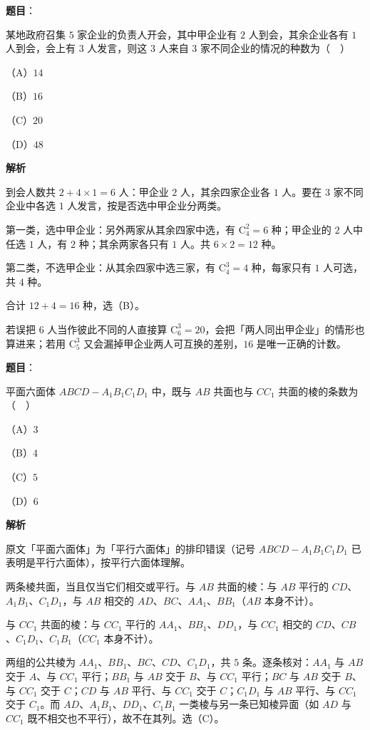 \begin{answer}

\textbf{题目}：

某地政府召集 $5$ 家企业的负责人开会，其中甲企业有 $2$ 人到会，其余企业各有 $1$ 人到会，会上有 $3$ 人发言，则这 $3$ 人来自 $3$ 家不同企业的情况的种数为（　）

（A）$14$

（B）$16$

（C）$20$

（D）$48$

\textbf{解析}

到会人数共 $2+4\times1=6$ 人：甲企业 $2$ 人，其余四家企业各 $1$ 人。要在 $3$ 家不同企业中各选 $1$ 人发言，按是否选中甲企业分两类。

第一类，选中甲企业：另外两家从其余四家中选，有 $\mathrm C_4^2=6$ 种；甲企业的 $2$ 人中任选 $1$ 人，有 $2$ 种；其余两家各只有 $1$ 人。共 $6\times2=12$ 种。

第二类，不选甲企业：从其余四家中选三家，有 $\mathrm C_4^3=4$ 种，每家只有 $1$ 人可选，共 $4$ 种。

合计 $12+4=16$ 种，选（B）。

若误把 $6$ 人当作彼此不同的人直接算 $\mathrm C_6^3=20$，会把「两人同出甲企业」的情形也算进来；若用 $\mathrm C_5^3$ 又会漏掉甲企业两人可互换的差别，$16$ 是唯一正确的计数。


\end{answer}
\begin{answer}

\textbf{题目}：

平面六面体 $ABCD-A_1B_1C_1D_1$ 中，既与 $AB$ 共面也与 $CC_1$ 共面的棱的条数为（　）

（A）$3$

（B）$4$

（C）$5$

（D）$6$

\textbf{解析}

原文「平面六面体」为「平行六面体」的排印错误（记号 $ABCD-A_1B_1C_1D_1$ 已表明是平行六面体），按平行六面体理解。

两条棱共面，当且仅当它们相交或平行。与 $AB$ 共面的棱：与 $AB$ 平行的 $CD$、$A_1B_1$、$C_1D_1$，与 $AB$ 相交的 $AD$、$BC$、$AA_1$、$BB_1$（$AB$ 本身不计）。

与 $CC_1$ 共面的棱：与 $CC_1$ 平行的 $AA_1$、$BB_1$、$DD_1$，与 $CC_1$ 相交的 $CD$、$CB$、$C_1D_1$、$C_1B_1$（$CC_1$ 本身不计）。

两组的公共棱为 $AA_1$、$BB_1$、$BC$、$CD$、$C_1D_1$，共 $5$ 条。逐条核对：$AA_1$ 与 $AB$ 交于 $A$、与 $CC_1$ 平行；$BB_1$ 与 $AB$ 交于 $B$、与 $CC_1$ 平行；$BC$ 与 $AB$ 交于 $B$、与 $CC_1$ 交于 $C$；$CD$ 与 $AB$ 平行、与 $CC_1$ 交于 $C$；$C_1D_1$ 与 $AB$ 平行、与 $CC_1$ 交于 $C_1$。而 $AD$、$A_1B_1$、$DD_1$、$C_1B_1$ 一类棱与另一条已知棱异面（如 $AD$ 与 $CC_1$ 既不相交也不平行），故不在其列。选（C）。


\end{answer}
